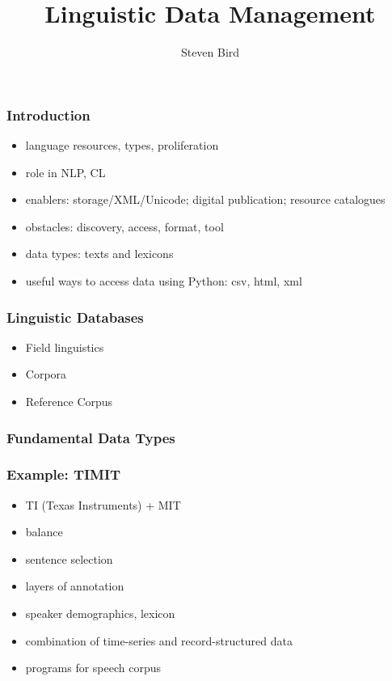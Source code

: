 \documentclass{beamer}             %
\title{Linguistic Data Management}
\author{Steven Bird}
\institute{
  University of Melbourne, AUSTRALIA
}
\begin{document}
\begin{frame}
  \titlepage
\end{frame}


\begin{frame}
  \frametitle{Introduction}
  \begin{itemize}
  \item language resources, types, proliferation
  \item role in NLP, CL
  \item enablers: storage/XML/Unicode; digital publication; resource catalogues
  \item obstacles: discovery, access, format, tool
  \item data types: texts and lexicons
  \item useful ways to access data using Python: csv, html, xml
  \end{itemize}

\end{frame}

\begin{frame}
\frametitle{Linguistic Databases}
\begin{itemize}
\item Field linguistics
\item Corpora
\item Reference Corpus
\end{itemize}
\end{frame}

\begin{frame}
\frametitle{Fundamental Data Types}
\end{frame}

\begin{frame}
\frametitle{Example: TIMIT}
\begin{itemize}
\item TI (Texas Instruments) + MIT
\item balance
\item sentence selection
\item layers of annotation
\item speaker demographics, lexicon
\item combination of time-series and record-structured data
\item programs for speech corpus
\end{itemize}
\end{frame}
\end{document}
